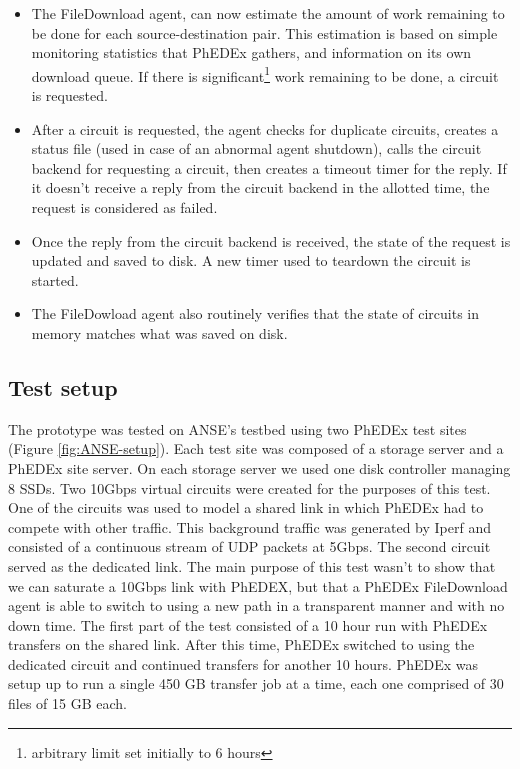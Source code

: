 \begin{itemize}
	\item The FileDownload agent, can now estimate the amount of work remaining 
	to be done for each source-destination pair. This estimation is based on simple 
	monitoring statistics that PhEDEx gathers, and information on its own download 
	queue. If there is significant\footnote{arbitrary limit set initially to 6 hours} 
	work remaining to be done, a circuit is requested.
	\item After a circuit is requested, the agent checks for duplicate circuits, creates 
	a status file (used in case of an abnormal agent shutdown), calls the circuit 
	backend for requesting a circuit, then creates a timeout timer for the reply.
	If it doesn't receive a reply from the circuit backend in the allotted time, the 
	request is considered as failed.
	\item Once the reply from the circuit backend is received, the state of the 
	request is updated and saved to disk. A new timer used to teardown the circuit is started.
	\item The FileDowload agent also routinely verifies that the state of circuits 
	in memory matches what was saved on disk.
\end{itemize}

\subsection{Test setup}

The prototype was tested on ANSE's testbed using two PhEDEx test sites (Figure \ref{fig:ANSE-setup}).
Each test site was composed of a storage server and a PhEDEx site server. On each storage
server we used one disk controller managing 8 SSDs. Two 10Gbps virtual circuits were created 
for the purposes of this test. One of the circuits was used to model a shared link in 
which PhEDEx had to compete with other traffic. This background traffic was generated 
by Iperf and consisted of a continuous stream of UDP packets at 5Gbps. The second circuit 
served as the dedicated link. The main purpose of this test wasn't to show that we can 
saturate a 10Gbps link with PhEDEX, but that a PhEDEx FileDownload agent is able to switch 
to using a new path in a transparent manner and with no down time. The first part of 
the test consisted of a 10 hour run with PhEDEx transfers on the shared link. After this 
time, PhEDEx switched to using the dedicated circuit and continued transfers for another 10 
hours. PhEDEx was setup up to run a single 450 GB transfer job at a time, each one 
comprised of 30 files of 15 GB each.

